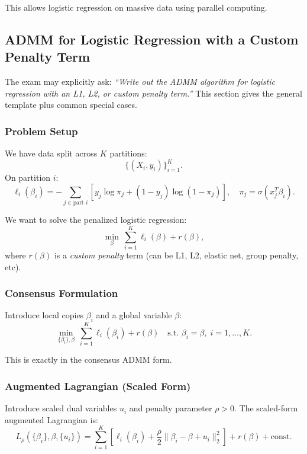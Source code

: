 \documentclass[11pt]{article}
\begin{document}
This allows logistic regression on massive data using parallel computing.

\subsection{ADMM for Logistic Regression with a Custom Penalty Term}

The exam may explicitly ask: \emph{``Write out the ADMM algorithm for logistic regression with an L1, L2, or custom penalty term.''} This section gives the general template plus common special cases.

\subsubsection*{Problem Setup}

We have data split across $K$ partitions:
\[
    \{(X_i, y_i)\}_{i=1}^K.
\]
On partition $i$:
\[
    \ell_i(\beta_i) = -\sum_{j \in \text{part } i} \left[
        y_j \log \pi_j + (1 - y_j) \log (1 - \pi_j)
    \right], \quad \pi_j = \sigma(x_j^T \beta_i).
\]

We want to solve the penalized logistic regression:
\[
    \min_\beta \ \sum_{i=1}^K \ell_i(\beta) + r(\beta),
\]
where $r(\beta)$ is a \emph{custom penalty} term (can be L1, L2, elastic net, group penalty, etc).

\subsubsection*{Consensus Formulation}

Introduce local copies $\beta_i$ and a global variable $\beta$:
\[
    \min_{\{\beta_i\},\beta} \ \sum_{i=1}^K \ell_i(\beta_i) + r(\beta)
    \quad \text{s.t. } \beta_i = \beta, \; i = 1,\dots,K.
\]

This is exactly in the consensus ADMM form.

\subsubsection*{Augmented Lagrangian (Scaled Form)}

Introduce scaled dual variables $u_i$ and penalty parameter $\rho > 0$. The scaled-form augmented Lagrangian is:
\[
    L_\rho(\{\beta_i\}, \beta, \{u_i\}) =
    \sum_{i=1}^K \left[
        \ell_i(\beta_i)
        + \frac{\rho}{2} \|\beta_i - \beta + u_i\|_2^2
    \right]
    + r(\beta) + \text{const}.
\]
\end{document}
